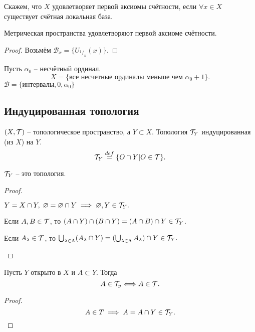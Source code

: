 \begin{definition}
    Скажем, что $X$ удовлетворяет первой аксиомы счётности, если $\forall x \in X$ существует счётная локальная база.
\end{definition}

\begin{theorem}
    Метрическая пространства удовлетворяют первой аксиоме счётности.
\end{theorem}
\begin{proof}
    Возьмём $\mathcal B_x = \{U_{^1/_n} (x)\}.$
\end{proof}

\begin{example}
    Пусть $\alpha_0$ -- несчётный ординал.
    $$X = \{\text{все несчетные ординалы меньше чем $\alpha_0 +1$}\}.$$ $\mathcal B = \{\text{интервалы}, 0, \alpha_0\}$
\end{example}

\subsection{Индуцированная топология}

\begin{definition}
    $(X, \mathcal T)$ -- топологическое пространство, а $Y \subset X$. Топология $\mathcal T_Y$ индуцированная (из $X$) на $Y$. \[
    \mathcal T_Y \overset{def}{=} \{O\cap Y| O\in \mathcal T\}.
    \]
\end{definition}

\begin{lemma}
    $\mathcal T_Y$ -- это топология.
\end{lemma}
\begin{proof}
    \begin{conditions}
        \item $Y = X \cap Y,\; \varnothing = \varnothing\cap Y \implies \varnothing, Y \in \mathcal T_Y.$ 
        \item Если $A, B \in \mathcal T$, то $(A\cap Y) \cap (B\cap Y) = (A \cap B) \cap Y \in \mathcal T_Y$.
        \item Если $A_\lambda \in \mathcal T$, то $\bigcup_{\lambda \in \Lambda} (A_\lambda \cap Y) = (\bigcup_{\lambda\in\Lambda}A_\lambda) \cap Y \in \mathcal T_Y.$
    \end{conditions}
\end{proof}
\begin{corollary}
    Пусть $Y$ открыто в $X$ и $A\subset Y$. Тогда \[
    A \in \mathcal T_y \Longleftrightarrow A \in \mathcal T.
    \]
\end{corollary}
\begin{proof}
    {$$A\in T\implies A = A \cap Y \in \mathcal T_Y.$$}
\end{proof}


